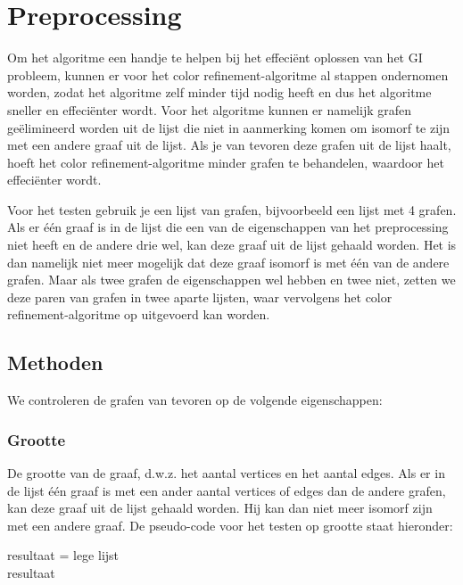 \documentclass{article}
\begin{document}
\section{Preprocessing}
Om het algoritme een handje te helpen bij het effeci\"ent oplossen van het GI probleem, kunnen er voor het color refinement-algoritme al stappen ondernomen worden, zodat het algoritme zelf minder tijd nodig heeft en dus het algoritme sneller en effeci\"enter wordt.
Voor het algoritme kunnen er namelijk grafen ge\"elimineerd worden uit de lijst die niet in aanmerking komen om isomorf te zijn met een andere graaf uit de lijst. Als je van tevoren deze grafen uit de lijst haalt, hoeft het color refinement-algoritme minder grafen te behandelen, waardoor het effeci\"enter wordt.

Voor het testen gebruik je een lijst van grafen, bijvoorbeeld een lijst met 4 grafen. Als er \'e\'en graaf is in de lijst die een van de eigenschappen van het preprocessing niet heeft en de andere drie wel, kan deze graaf uit de lijst gehaald worden. Het is dan namelijk niet meer mogelijk dat deze graaf isomorf is met \'e\'en van de andere grafen. Maar als twee grafen de eigenschappen wel hebben en twee niet, zetten we deze paren van grafen in twee aparte lijsten, waar vervolgens het color refinement-algoritme op uitgevoerd kan worden.

\subsection{Methoden}
We controleren de grafen van tevoren op de volgende eigenschappen:
\subsubsection{Grootte}
De grootte van de graaf, d.w.z. het aantal vertices en het aantal edges. Als er in de lijst één graaf is met een ander aantal vertices of edges dan de andere grafen, kan deze graaf uit de lijst gehaald worden. Hij kan dan niet meer isomorf zijn met een andere graaf. De pseudo-code voor het testen op grootte staat hieronder:\\

\begin{algorithm}[H]
	resultaat = lege lijst\\
	\Return resultaat
\end{algorithm}
\end{document}
